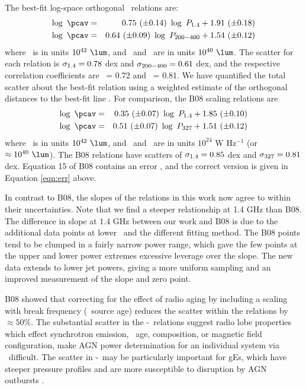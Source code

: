\documentclass{emulateapj}
\begin{document}
The best-fit log-space orthogonal \bces\ relations are:
\begin{eqnarray}
  \log~\pcav &=& 0.75~(\pm 0.14)~\log~\phigh + 1.91~(\pm 0.18) \label{eqn:high}\\
  \log~\pcav &=& 0.64~(\pm 0.09)~\log~\plow + 1.54~(\pm 0.12) \label{eqn:low}
\end{eqnarray}
where \pcav\ is in units $10^{42} ~\lum$, and \phigh\ and \plow\ are
in units $10^{40} ~\lum$. The scatter for each relation is $\sigma_{\mathrm{1.4}} =
0.78$ dex and $\sigma_{\mathrm{200-400}} = 0.61$ dex, and the respective correlation
coefficients are \rhigh\ = 0.72 and \rlow\ = 0.81. We have quantified
the total scatter about the best-fit relation using a weighted
estimate of the orthogonal distances to the best-fit line
\citep[see][]{2009A&A...498..361P}. For comparison, the B08 scaling
relations are
\begin{eqnarray}
  \log~\pcav &=& 0.35~(\pm 0.07)~\log~\phigh + 1.85~(\pm 0.10) \\
  \log~\pcav &=& 0.51~(\pm 0.07)~\log~\pthree + 1.51~(\pm 0.12) \label{eqn:err}
\end{eqnarray}
where \pcav\ is in units $10^{42} ~\lum$, and \phigh\ and \pthree\ are
in units $10^{24}$ W Hz$^{-1}$ (or $\approx 10^{40} ~\lum$). The B08
relations have scatters of $\sigma_{\mathrm{1.4}} = 0.85$ dex and $\sigma_{\mathrm{327}} = 0.81$
dex. Equation 15 of B08 contains an error \citep{birzan08err}, and the
correct version is given in Equation \ref{eqn:err} above.

In contrast to B08, the slopes of the relations in this work now agree
to within their uncertainties. Note that we find a steeper
relationship at 1.4 GHz than B08. The difference in slope at 1.4 GHz
between our work and B08 is due to the additional data points at lower
\pjet\ and the different fitting method. The B08 points tend to be
clumped in a fairly narrow power range, which gave the few points at
the upper and lower power extremes excessive leverage over the
slope. The new data extends to lower jet powers, giving a more uniform
sampling and an improved measurement of the slope and zero point.

B08 showed that correcting for the effect of radio aging by including
a scaling with break frequency (\ie\ source age) reduces the scatter
within the relations by $\approx 50\%$. The substantial scatter in the
\pjet-\prad\ relations suggest radio lobe properties which effect
synchrotron emission, \eg\ age, composition, or magnetic field
configuration, make AGN power determination for an individual system
via \prad\ difficult. The scatter in \pjet-\prad\ may be particularly
important for gEs, which have steeper pressure profiles and are more
susceptible to disruption by AGN outbursts \citep{2006MNRAS.372.1161W,
  2008ApJ...687L..53P}.
\end{document}
